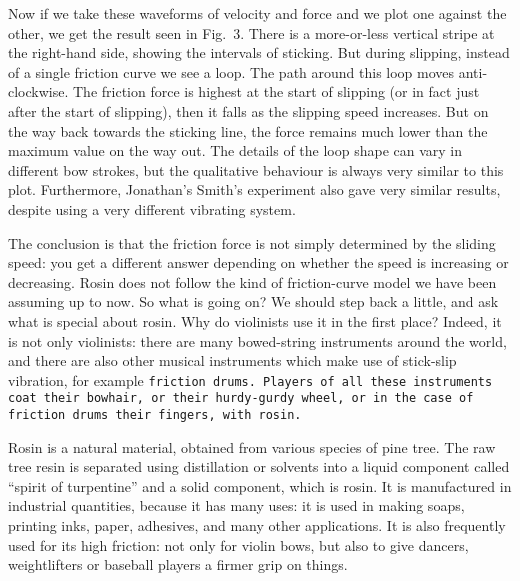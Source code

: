 
  Now if we take these waveforms of velocity and force and we plot one against 
  the other, we get the result seen in Fig.\ 3. There is a more-or-less 
  vertical stripe at the right-hand side, showing the intervals of sticking. 
  But during slipping, instead of a single friction curve we see a loop. The 
  path around this loop moves anti-clockwise. The friction force is highest at 
  the start of slipping (or in fact just after the start of slipping), then it 
  falls as the slipping speed increases. But on the way back towards the 
  sticking line, the force remains much lower than the maximum value on the way 
  out. The details of the loop shape can vary in different bow strokes, but the 
  qualitative behaviour is always very similar to this plot. Furthermore, 
  Jonathan’s Smith’s experiment also gave very similar results, despite using a 
  very different vibrating system. 


  The conclusion is that the friction force is not simply determined by the 
  sliding speed: you get a different answer depending on whether the speed is 
  increasing or decreasing. Rosin does not follow the kind of friction-curve 
  model we have been assuming up to now. So what is going on? We should step 
  back a little, and ask what is special about rosin. Why do violinists use it 
  in the first place? Indeed, it is not only violinists: there are many 
  bowed-string instruments around the world, and there are also other musical 
  instruments which make use of stick-slip vibration, for example \tt{}friction 
  drums\rm{}. Players of all these instruments coat their bowhair, or their 
  hurdy-gurdy wheel, or in the case of friction drums their fingers, with 
  rosin. 

  Rosin is a natural material, obtained from various species of pine tree. The 
  raw tree resin is separated using distillation or solvents into a liquid 
  component called “spirit of turpentine” and a solid component, which is 
  rosin. It is manufactured in industrial quantities, because it has many uses: 
  it is used in making soaps, printing inks, paper, adhesives, and many other 
  applications. It is also frequently used for its high friction: not only for 
  violin bows, but also to give dancers, weightlifters or baseball players a 
  firmer grip on things. 

